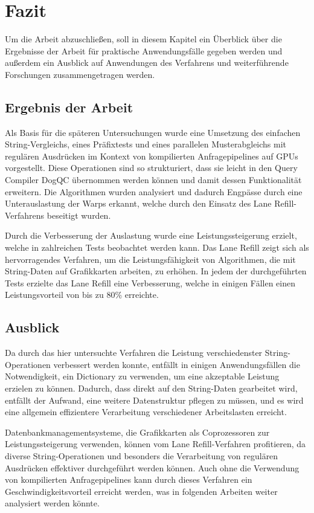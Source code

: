 \chapter{Fazit}

Um die Arbeit abzuschließen, soll in diesem Kapitel ein Überblick über die Ergebnisse der Arbeit für praktische Anwendungsfälle gegeben werden und außerdem ein Ausblick auf Anwendungen des Verfahrens und weiterführende Forschungen zusammengetragen werden.

\section{Ergebnis der Arbeit}

Als Basis für die späteren Untersuchungen wurde eine Umsetzung des einfachen String-Vergleichs, eines Präfixtests und eines parallelen Musterabgleichs mit regulären Ausdrücken im Kontext von kompilierten Anfragepipelines auf GPUs vorgestellt.
Diese Operationen sind so strukturiert, dass sie leicht in den Query Compiler DogQC übernommen werden können und damit dessen Funktionalität erweitern.
Die Algorithmen wurden analysiert und dadurch Engpässe durch eine Unterauslastung der Warps erkannt, welche durch den Einsatz des Lane Refill-Verfahrens beseitigt wurden.

Durch die Verbesserung der Auslastung wurde eine Leistungssteigerung erzielt, welche in zahlreichen Tests beobachtet werden kann.
Das Lane Refill zeigt sich als hervorragendes Verfahren, um die Leistungsfähigkeit von Algorithmen, die mit String-Daten auf Grafikkarten arbeiten, zu erhöhen.
In jedem der durchgeführten Tests erzielte das Lane Refill eine Verbesserung, welche in einigen Fällen einen Leistungsvorteil von bis zu 80\% erreichte.


\section{Ausblick}

Da durch das hier untersuchte Verfahren die Leistung verschiedenster String-Operationen verbessert werden konnte, entfällt in einigen Anwendungsfällen die Notwendigkeit, ein Dictionary zu verwenden, um eine akzeptable Leistung erzielen zu können.
Dadurch, dass direkt auf den String-Daten gearbeitet wird, entfällt der Aufwand, eine weitere Datenstruktur pflegen zu müssen, und es wird eine allgemein effizientere Verarbeitung verschiedener Arbeitslasten erreicht.

Datenbankmanagementsysteme, die Grafikkarten als Coprozessoren zur Leistungssteigerung verwenden, können vom Lane Refill-Verfahren profitieren, da diverse String-Ope\-ra\-tio\-nen und besonders die Verarbeitung von regulären Ausdrücken effektiver durchgeführt werden können.
Auch ohne die Verwendung von kompilierten Anfragepipelines kann durch dieses Verfahren ein Geschwindigkeitsvorteil erreicht werden, was in folgenden Arbeiten weiter analysiert werden könnte.

